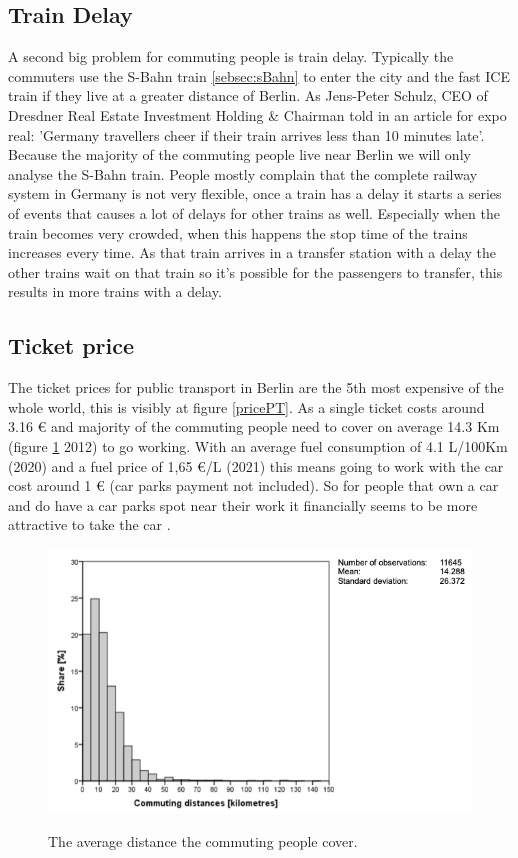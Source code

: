 \subsection{Train Delay}
A second big problem for commuting people is train delay. Typically the commuters use  the S-Bahn train \ref{sebsec:sBahn} to enter the city and the fast ICE train if they live at a greater distance of Berlin. As Jens-Peter Schulz, CEO of Dresdner Real Estate Investment Holding \& Chairman told in an article for expo real: 'Germany travellers cheer if their train arrives less than 10 minutes late'. Because the majority of the commuting people live near Berlin we will only analyse the S-Bahn train. People mostly complain that the complete railway system in Germany is not very flexible, once a train has a delay it starts a series of events that causes a lot of delays for other trains as well. Especially when the train becomes very crowded, when this happens the stop time of the trains increases every time. As that train arrives in a transfer station with a delay the other trains wait on that train so it's possible for the passengers to transfer, this results in more trains with a delay. 

\subsection{Ticket price} \label{subsec:ticketprice}
The ticket prices for public transport in Berlin are the 5th most expensive of the whole world, this is visibly at figure \ref{pricePT}. As a single ticket costs around 3.16 € and majority of the commuting people need to cover on average 14.3 Km (figure \ref{averageComDis} 2012) to go working. With an average fuel consumption of 4.1 L/100Km (2020) and a fuel price of  1,65 €/L (2021) this means going to work with the car cost around 1 € (car parks payment not included). So for people that own a car and do have a car parks spot near their work it financially seems to be more attractive to take the car . 

\begin{figure}[h!]
	\centering
	\includegraphics[width=0.55\textheight]{ProblemsFigures/averageCommutingDistance}
	\label{averageComDis}
	\caption{The average distance the commuting people cover. }
\end{figure}

